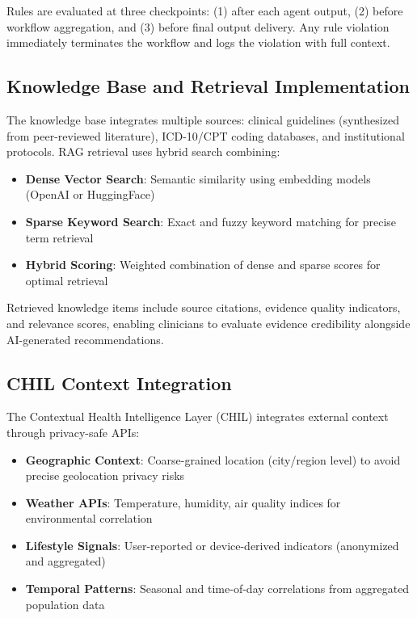 \documentclass[conference]{IEEEtran}
\begin{document}
Rules are evaluated at three checkpoints: (1) after each agent output, (2) before workflow aggregation, and (3) before final output delivery. Any rule violation immediately terminates the workflow and logs the violation with full context.

\subsection{Knowledge Base and Retrieval Implementation}
The knowledge base integrates multiple sources: clinical guidelines (synthesized from peer-reviewed literature), ICD-10/CPT coding databases, and institutional protocols. RAG retrieval uses hybrid search combining:

\begin{itemize}
    \item \textbf{Dense Vector Search}: Semantic similarity using embedding models (OpenAI or HuggingFace)
    \item \textbf{Sparse Keyword Search}: Exact and fuzzy keyword matching for precise term retrieval
    \item \textbf{Hybrid Scoring}: Weighted combination of dense and sparse scores for optimal retrieval
\end{itemize}

Retrieved knowledge items include source citations, evidence quality indicators, and relevance scores, enabling clinicians to evaluate evidence credibility alongside AI-generated recommendations.

\subsection{CHIL Context Integration}
The Contextual Health Intelligence Layer (CHIL) integrates external context through privacy-safe APIs:

\begin{itemize}
    \item \textbf{Geographic Context}: Coarse-grained location (city/region level) to avoid precise geolocation privacy risks
    \item \textbf{Weather APIs}: Temperature, humidity, air quality indices for environmental correlation
    \item \textbf{Lifestyle Signals}: User-reported or device-derived indicators (anonymized and aggregated)
    \item \textbf{Temporal Patterns}: Seasonal and time-of-day correlations from aggregated population data
\end{itemize}
\end{document}
